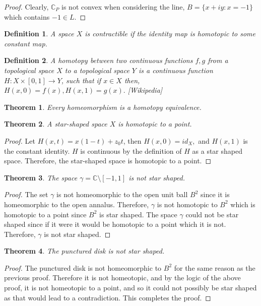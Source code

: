 \documentclass[letter]{article}
\newtheorem{theorem}{Theorem}
\newtheorem{definition}{Definition}
\newenvironment{menumerate}{%
  \edef\backupindent{\the\parindent}%
  \enumerate%
  \setlength{\parindent}{\backupindent}%
}{\endenumerate}
\begin{document}
\begin{menumerate}
\begin{proof}
		Clearly, $\mathbb{C}_P$ is not convex when considering the line, $B = \{x + iy : x = -1\}$ which contains $-1 \in L.$
 	\end{proof}
 	\begin{definition}
 		A space $X$ is contractible if the identity map is homotopic to some constant map.
 	\end{definition}
 	\begin{definition}
 		A homotopy between two continuous functions $f,g$ from a topological space $X$ to a topological space $Y$ is a continuous function $H: X \times [0,1] \to Y$, such that if $x \in X$ then,
 		$H(x,0) = f(x), H(x,1) = g(x).$ [Wikipedia]
 	\end{definition}
 	\begin{theorem}
 		Every homeomorphism is a homotopy equivalence.
 	\end{theorem}
 	\begin{theorem}
 		A star-shaped space $X$ is homotopic to a point.
 	\end{theorem}
 	\begin{proof}
 		Let $H(x,t) = x(1-t)+z_0t$, then $H(x,0) = id_X,$ and $H(x,1)$ is the constant identity. $H$ is continuous by the definition of $H$ as a star shaped space. Therefore, the star-shaped space is homotopic to a point.
 	\end{proof}
 	\begin{theorem}
 		The space $\gamma = \mathbb{C}\setminus[-1,1]$ is not star shaped.
 	\end{theorem}
 	\begin{proof}
 		The set $\gamma$ is not homeomorphic to the open unit ball $B^2$ since it is homeomorphic to the open annalus. Therefore, $\gamma$ is not homotopic to
 		$B^2$ which is homotopic to a point since $B^2$ is star shaped.
 		The space $\gamma$ could not be star shaped since if it were it would be homotopic to a point which it is not. Therefore, $\gamma$
 		is not star shaped. 
 	\end{proof}
 	\begin{theorem}
 		The punctured disk is not star shaped.
 	\end{theorem}
 	\begin{proof}
 		The punctured disk is not homeomorphic to $B^2$ for the same reason as the previous proof. Therefore it is not homeotopic, and by the logic of
 		the above proof, it is not homeotopic to a point, and so it could not possibly be star shaped as that would lead to a contradiction. This completes the proof.
 	\end{proof}

\end{menumerate}
\end{document}
